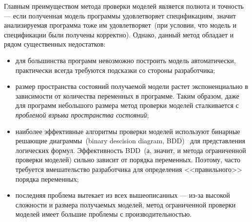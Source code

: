 Главным преимуществом метода проверки моделей является полнота и точность --- 
если полученная модель программы удовлетворяет спецификациям, значит 
анализируемая программа тоже им удовлетворяет~(при условии, что модель и 
спецификации были получены корректно). Однако, данный метод обладает и рядом
существенных недостатков:
\begin{itemize}
\item для большинства программ невозможно построить модель автоматически,
практически всегда требуются подсказки со стороны разработчика;

\item размер пространства состояний получаемой модели растет экспоненциально в 
зависимости от количества переменных в программе. Таким образом, даже для
программ небольшого размера метод проверки моделей сталкивается с 
\emph{проблемой взрыва пространства состояний};

\item наиболее эффективные алгоритмы проверки моделей используют бинарные
решающие диаграммы~(binary descision diagram, BDD)~\cite{bdds} для 
представления логических формул. Эффективность BDD~(а, значит, и метода
ограниченной проверки моделей) сильно зависит от порядка переменных. Поэтому,
часто требуется вмешательство разработчика для определения <<правильного>>
порядка переменных;

\item последняя проблема вытекает из всех вышеописанных --- из-за высокой
сложности и размера получаемых моделей, метод ограниченной проверки моделей
имеет большие проблемы с производительностью.
\end{itemize}


